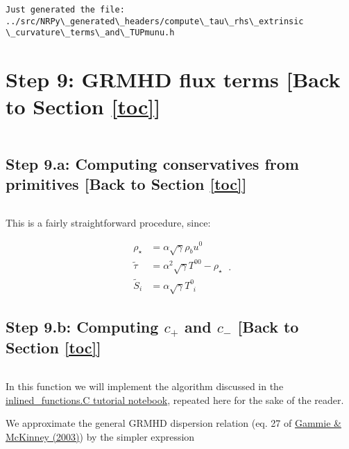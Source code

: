 \documentclass[landscape,letterpaper,10pt,english]{article}
\begin{document}
    \begin{Verbatim}[commandchars=\\\{\}]
Just generated the file: ../src/NRPy\_generated\_headers/compute\_tau\_rhs\_extrinsic
\_curvature\_terms\_and\_TUPmunu.h
    \end{Verbatim}

    \section{\texorpdfstring{Step 9: GRMHD flux terms {[}Back to
Section \ref{toc}{]}}{Step 9: GRMHD flux terms {[}Back to {]}}}\label{step-9-grmhd-flux-terms-back-to-top}

\[\label{mhdflux}\]

    \subsection{\texorpdfstring{Step 9.a: Computing conservatives from
primitives {[}Back to
Section \ref{toc}{]}}{Step 9.a: Computing conservatives from primitives {[}Back to {]}}}\label{step-9.a-computing-conservatives-from-primitives-back-to-top}

\[\label{prim_to_conserv}\]

This is a fairly straightforward procedure, since:

\[
\boxed{
\begin{aligned}
\rho_{\star}  &= \alpha\sqrt{\gamma}\rho_{b}u^{0}\\
\tilde{\tau}  &= \alpha^{2}\sqrt{\gamma}T^{00} - \rho_{\star}\\
\tilde{S}_{i} &= \alpha\sqrt{\gamma}T^{0}_{\ \ i}
\end{aligned}
}\ .
\]

    \subsection{\texorpdfstring{Step 9.b: Computing \(c_{+}\) and \(c_{-}\)
{[}Back to
Section \ref{toc}{]}}{Step 9.b: Computing c\_\{+\} and c\_\{-\} {[}Back to {]}}}\label{step-9.b-computing-c_-and-c_--back-to-top}

\[\label{compute_cp_and_cm}\]

In this function we will implement the algorithm discussed in the
\href{Tutorial-IllinoisGRMHD__inlined_functions.ipynb}{inlined\_functions.C
tutorial notebook}, repeated here for the sake of the reader.

We approximate the general GRMHD dispersion relation (eq. 27 of
\href{https://arxiv.org/pdf/astro-ph/0301509.pdf}{Gammie \& McKinney
(2003)}) by the simpler expression
\end{document}
